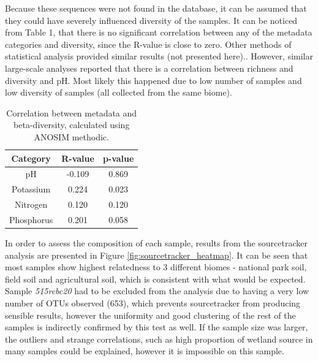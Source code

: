 \documentclass[12pt]{article}
\begin{document}
\begin{multicols}{2}
Because these sequences were not found in the database, it can be assumed that they could have severely influenced diversity of the samples.
It can be noticed from Table 1, that there is no significant correlation between any of the metadata categories and diversity, since the R-value is close to zero. Other methods of statistical analysis provided similar results (not presented here).. However, similar large-scale analyses reported that there is a correlation between richness and diversity and pH\cite{Thompson2017,Fierer2006,Wu2016}.  Most likely this happened due to low number of samples and low diversity of samples (all collected from the same biome).
\begin{table}[H]
	\begin{center}
		\label{tab:table_correlation}
		\begin{tabular}{c|c|c}
			\textbf{Category} & \textbf{R-value} & \textbf{p-value}\\
			\hline
			pH & -0.109 & 0.869\\
			Potassium & 0.224 & 0.023\\
			Nitrogen & 0.120 & 0.120 \\
			Phosphorus & 0.201 & 0.058\\
		\end{tabular}
		\caption{Correlation between metadata and beta-diversity, calculated using ANOSIM\cite{CLARKE1993} methodic.}
	\end{center}
\end{table}
\par
In order to assess the composition of each sample, results from the sourcetracker analysis are presented in Figure \ref{fig:sourcetracker_heatmap}. It can be seen that most samples show highest relatedness to 3 different biomes - national park soil, field soil and agricultural soil, which is consistent with what would be expected. Sample \textit{515rcbc20} had to be excluded from the analysis due to having a very low number of OTUs observed (653), which prevents sourcetracker from producing sensible results, however the uniformity and good clustering of the rest of the samples is indirectly confirmed by this test as well. If the sample size was larger, the outliers and strange correlations, such as high proportion of wetland source in many samples could be explained, however it is impossible on this sample.
\begin{figure}[H]

\end{figure}
\end{multicols}
\end{document}
